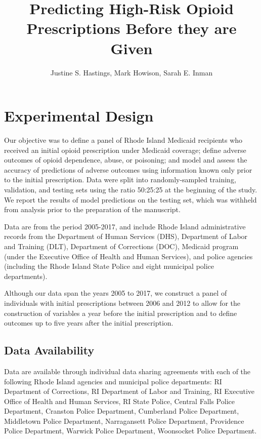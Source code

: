 \documentclass[9pt,twoside]{pnas-new}
\title{Predicting High-Risk Opioid Prescriptions Before they are Given}
\author{Justine S. Hastings, Mark Howison, Sarah E. Inman}
\begin{document}
\maketitle

\SItext

\section{Experimental Design}

Our objective was to define a panel of Rhode Island Medicaid recipients who received an initial opioid prescription under Medicaid coverage; define adverse outcomes of opioid dependence, abuse, or poisoning; and model and assess the accuracy of predictions of adverse outcomes using information known only prior to the initial prescription. Data were split into randomly-sampled training, validation, and testing sets using the ratio 50:25:25 at the beginning of the study. We report the results of model predictions on the testing set, which was withheld from analysis prior to the preparation of the manuscript.

Data are from the period 2005-2017, and include Rhode Island administrative records from the Department of Human Services (DHS), Department of Labor and Training (DLT), Department of Corrections (DOC), Medicaid program (under the Executive Office of Health and Human Services), and police agencies (including the Rhode Island State Police and eight municipal police departments).

Although our data span the years 2005 to 2017, we construct a panel of individuals with initial prescriptions between 2006 and 2012 to allow for the construction of variables a year before the initial prescription and to define outcomes up to five years after the initial prescription.

\subsection{Data Availability}

Data are available through individual data sharing agreements with each of the following Rhode Island agencies and municipal police departments: RI Department of Corrections, RI Department of Labor and Training, RI Executive Office of Health and Human Services, RI State Police, Central Falls Police Department, Cranston Police Department, Cumberland Police Department, Middletown Police Department, Narragansett Police Department, Providence Police Department, Warwick Police Department, Woonsocket Police Department.
\end{document}

